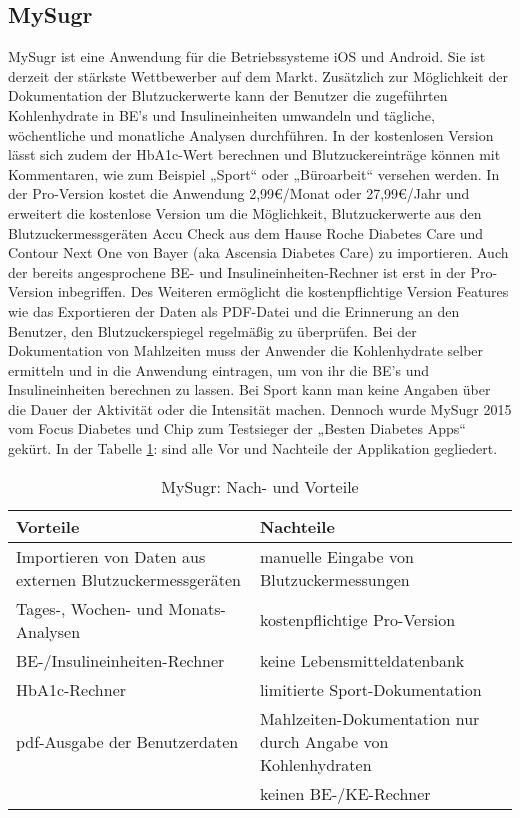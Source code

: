 	\subsection{MySugr}
	MySugr ist eine Anwendung für die Betriebssysteme iOS und Android. Sie ist derzeit der stärkste Wettbewerber auf dem Markt. Zusätzlich zur Möglichkeit der Dokumentation der Blutzuckerwerte kann der Benutzer die zugeführten Kohlenhydrate in BE's und Insulineinheiten umwandeln und tägliche, wöchentliche und monatliche Analysen durchführen.  In der kostenlosen Version lässt sich zudem der HbA1c-Wert berechnen und Blutzuckereinträge können mit Kommentaren, wie zum Beispiel „Sport“ oder „Büroarbeit“ versehen werden. In der Pro-Version kostet die Anwendung 2,99\euro{}/Monat oder 27,99\euro{}/Jahr und erweitert die kostenlose Version um die Möglichkeit, Blutzuckerwerte aus den Blutzuckermessgeräten \glqq Accu Check\grqq{} aus dem Hause Roche Diabetes Care und \glqq Contour Next One\grqq{} von Bayer (aka Ascensia Diabetes Care) zu importieren. Auch der bereits angesprochene BE- und Insulineinheiten-Rechner ist erst in der Pro-Version inbegriffen. Des Weiteren ermöglicht die kostenpflichtige Version Features wie das Exportieren der Daten als PDF-Datei und die Erinnerung an den Benutzer, den Blutzuckerspiegel regelmäßig zu überprüfen. Bei der Dokumentation von Mahlzeiten muss der Anwender die Kohlenhydrate selber ermitteln und in die Anwendung eintragen, um von ihr die BE’s und Insulineinheiten berechnen zu lassen. Bei Sport kann man keine Angaben über die Dauer der Aktivität oder die Intensität machen. Dennoch wurde MySugr 2015 vom Focus Diabetes und Chip zum Testsieger der „Besten Diabetes Apps“ gekürt.  In der Tabelle  \ref{tab:MySugr}:   sind alle Vor und Nachteile der Applikation gegliedert.\cite{MS}
	\begin{table}[H]
		\setlength{\tabcolsep}{12pt}
		\centering
		\begin{tabular}{p{6cm}|p{6cm}}
			\toprule
			\textbf{Vorteile} & \textbf{Nachteile}\\
			\hline
			Importieren von Daten aus externen Blutzuckermessgeräten & manuelle Eingabe von Blutzuckermessungen\\
			\hline
			Tages-, Wochen- und Monats-Analysen & kostenpflichtige Pro-Version\\
			\hline
			BE-/Insulineinheiten-Rechner & keine Lebensmitteldatenbank\\
			\hline
			HbA1c-Rechner & limitierte Sport-Dokumentation\\
			\hline
			pdf-Ausgabe der Benutzerdaten & Mahlzeiten-Dokumentation nur durch Angabe von Kohlenhydraten\\
			\hline
			& keinen BE-/KE-Rechner\\
			\bottomrule
		\end{tabular}
		\captionsetup{justification=centering}
		\caption{MySugr: Nach- und Vorteile}
		\label{tab:MySugr}
	\end{table}
